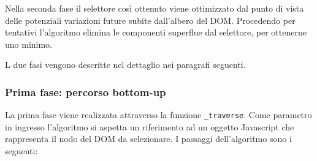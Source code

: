 Nella seconda fase il selettore così ottenuto viene ottimizzato dal punto di vista delle potenziali variazioni future subite dall'albero del DOM. Procedendo per tentativi l'algoritmo elimina le componenti superflue dal selettore, per ottenerne uno minimo.

L due fasi vengono descritte nel dettaglio nei paragrafi seguenti.

\subsubsection {Prima fase: percorso bottom-up}

La prima fase viene realizzata attraverso la funzione \verb|_traverse|. Come parametro in ingresso l'algoritmo si aspetta un riferimento ad un oggetto Javascript che rappresenta il nodo del DOM da selezionare. I passaggi dell'algoritmo sono i seguenti:

